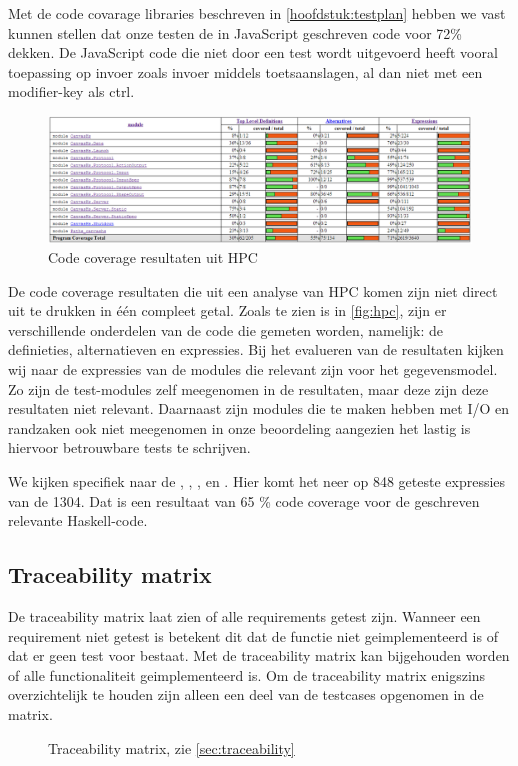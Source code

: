 Met de code covarage libraries beschreven in \autoref{hoofdstuk:testplan} hebben we vast kunnen stellen dat onze testen de in JavaScript geschreven code voor 72\% dekken. De JavaScript code die niet door een test wordt uitgevoerd heeft vooral toepassing op invoer zoals invoer middels toetsaanslagen, al dan niet met een modifier-key als ctrl.

\begin{figure}
\begin{center}
\includegraphics[keepaspectratio,width=\textwidth]{./images/haskellcoverage.png}
\caption{Code coverage resultaten uit HPC}
\label{fig:hpc}
\end{center}
\end{figure}

De code coverage resultaten die uit een analyse van HPC komen zijn niet direct uit te drukken in één compleet getal. Zoals te zien is in \autoref{fig:hpc}, zijn er verschillende onderdelen van de code die gemeten worden, namelijk: de definieties, alternatieven en expressies. Bij het evalueren van de resultaten kijken wij naar de expressies van de modules die relevant zijn voor het gegevensmodel. Zo zijn de test-modules zelf meegenomen in de resultaten, maar deze zijn deze resultaten niet relevant. Daarnaast zijn modules die te maken hebben met I/O en randzaken ook niet meegenomen in onze beoordeling aangezien het lastig is hiervoor betrouwbare tests te schrijven.

We kijken specifiek naar de , , ,  en . Hier komt het neer op 848 geteste expressies van de 1304. Dat is een resultaat van 65 \% code coverage voor de geschreven relevante Haskell-code.

\subsection{Traceability matrix} \label{sec:traceability}
De traceability matrix laat zien of alle requirements getest zijn. Wanneer een requirement niet getest is betekent dit dat de functie niet geimplementeerd is of dat er geen test voor bestaat. Met de traceability matrix kan bijgehouden worden of alle functionaliteit geimplementeerd is. Om de traceability matrix enigszins overzichtelijk te houden zijn alleen een deel van de testcases opgenomen in de matrix.

\begin{figure}
\begin{center}
\resizebox{\linewidth}{!}{}
\caption{Traceability matrix, zie \autoref{sec:traceability}}
\label{fig:traceability}
\end{center}
\end{figure}





